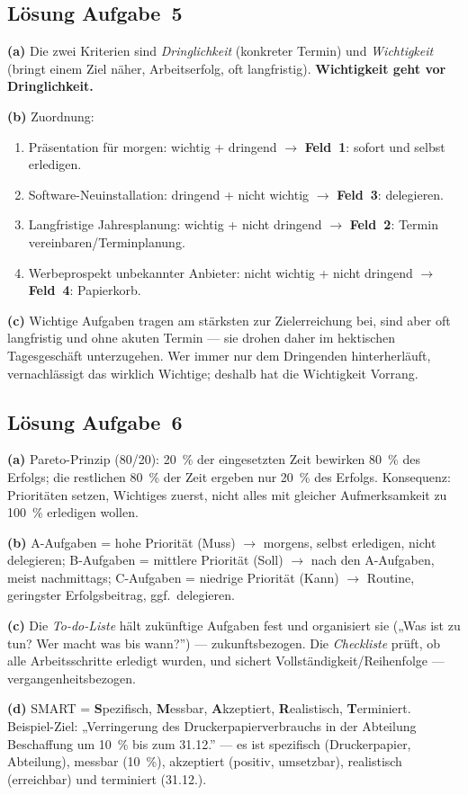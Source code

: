 \documentclass[11pt, a4paper]{article}
\begin{document}
\subsection*{Lösung Aufgabe~5}
\begin{loesung}
\textbf{(a)} Die zwei Kriterien sind \emph{Dringlichkeit} (konkreter Termin) und
\emph{Wichtigkeit} (bringt einem Ziel näher, Arbeitserfolg, oft langfristig).
\textbf{Wichtigkeit geht vor Dringlichkeit.}

\textbf{(b)} Zuordnung:
\begin{enumerate}[label=\arabic*., itemsep=0pt]
  \item Präsentation für morgen: wichtig + dringend $\rightarrow$ \textbf{Feld~1}: sofort und selbst erledigen.
  \item Software-Neuinstallation: dringend + nicht wichtig $\rightarrow$ \textbf{Feld~3}: delegieren.
  \item Langfristige Jahresplanung: wichtig + nicht dringend $\rightarrow$ \textbf{Feld~2}: Termin vereinbaren/Terminplanung.
  \item Werbeprospekt unbekannter Anbieter: nicht wichtig + nicht dringend $\rightarrow$ \textbf{Feld~4}: Papierkorb.
\end{enumerate}

\textbf{(c)} Wichtige Aufgaben tragen am stärksten zur Zielerreichung bei, sind aber oft
langfristig und ohne akuten Termin --- sie drohen daher im hektischen Tagesgeschäft
unterzugehen. Wer immer nur dem Dringenden hinterherläuft, vernachlässigt das wirklich
Wichtige; deshalb hat die Wichtigkeit Vorrang.
\end{loesung}

\subsection*{Lösung Aufgabe~6}
\begin{loesung}
\textbf{(a)} Pareto-Prinzip (80/20): 20~\% der eingesetzten Zeit bewirken 80~\% des
Erfolgs; die restlichen 80~\% der Zeit ergeben nur 20~\% des Erfolgs. Konsequenz:
Prioritäten setzen, Wichtiges zuerst, nicht alles mit gleicher Aufmerksamkeit zu 100~\%
erledigen wollen.

\textbf{(b)} A-Aufgaben = hohe Priorität (Muss) $\rightarrow$ morgens, selbst erledigen,
nicht delegieren; B-Aufgaben = mittlere Priorität (Soll) $\rightarrow$ nach den
A-Aufgaben, meist nachmittags; C-Aufgaben = niedrige Priorität (Kann) $\rightarrow$
Routine, geringster Erfolgsbeitrag, ggf.\ delegieren.

\textbf{(c)} Die \emph{To-do-Liste} hält zukünftige Aufgaben fest und organisiert sie
(„Was ist zu tun? Wer macht was bis wann?”) --- zukunftsbezogen. Die \emph{Checkliste}
prüft, ob alle Arbeitsschritte erledigt wurden, und sichert Vollständigkeit/Reihenfolge
--- vergangenheitsbezogen.

\textbf{(d)} SMART = \textbf{S}pezifisch, \textbf{M}essbar, \textbf{A}kzeptiert,
\textbf{R}ealistisch, \textbf{T}erminiert. Beispiel-Ziel: „Verringerung des
Druckerpapierverbrauchs in der Abteilung Beschaffung um 10~\% bis zum 31.12.” --- es ist
spezifisch (Druckerpapier, Abteilung), messbar (10~\%), akzeptiert (positiv,
umsetzbar), realistisch (erreichbar) und terminiert (31.12.).
\end{loesung}
\end{document}
